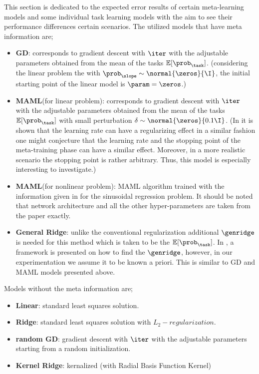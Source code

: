 This section is dedicated to the expected error results of certain meta-learning models and some individual task learning models with the aim to see their performance differences certain scenarios. The utilized models that have meta information are;
\begin{itemize}
  \item \textbf{GD}: corresponds to gradient descent with $\iter$ with the adjustable parameters obtained from the mean of the tasks $\mathbb{E}[\prob_{\task}]$. (\eg considering the linear problem the with $\prob_{\slope}\sim\normal{\zeros}{\I}$, the initial starting point of the linear model is $\param=\zeros$.)
  \item \textbf{MAML}(for linear problem): corresponds to gradient descent with $\iter$ with the adjustable parameters obtained from the mean of the tasks $\mathbb{E}[\prob_{\task}]$ with small perturbation $\delta\sim\normal{\zeros}{0.1\I}$. (In \cite{Nakkiran2020b} it is shown that the learning rate can have a regularizing effect in a similar fashion one might conjecture that the learning rate and the stopping point of the meta-training phase can have a similar effect. Moreover, in a more realistic scenario the stopping point is rather arbitrary. Thus, this model is especially interesting to investigate.)
  \item \textbf{MAML}(for nonlinear problem): MAML algorithm trained with the information given in \cite{Finn2017} for the sinusoidal regression problem. It should be noted that network architecture and all the other hyper-parameters are taken from the paper exactly.
  \item \textbf{General Ridge}: unlike the conventional regularization additional $\genridge$ is needed for this method which is taken to be the $\mathbb{E}[\prob_{\task}]$. In \cite{Denevi2018a}, a framework is presented on how to find the $\genridge$, however, in our experimentation we assume it to be known a priori. This is similar to GD and MAML models presented above.
\end{itemize} 
Models without the meta information are;
\begin{itemize}
  \item \textbf{Linear}: standard least squares solution.
  \item \textbf{Ridge}: standard least squares solution with $L_2-regularization$.
  \item \textbf{random GD}: gradient descent with $\iter$ with the adjustable parameters starting from a random initialization.
  \item \textbf{Kernel Ridge}: kernalized (with Radial Basis Function Kernel) 
\end{itemize}

